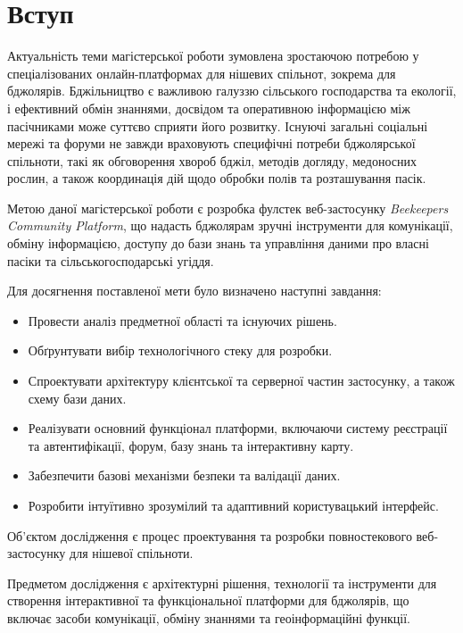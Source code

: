 \chapter*{Вступ}
\label{ch:introduction}

Актуальність теми магістерської роботи зумовлена зростаючою потребою у спеціалізованих онлайн-платформах для нішевих спільнот, зокрема для бджолярів. Бджільництво є важливою галуззю сільського господарства та екології, і ефективний обмін знаннями, досвідом та оперативною інформацією між пасічниками може суттєво сприяти його розвитку. Існуючі загальні соціальні мережі та форуми не завжди враховують специфічні потреби бджолярської спільноти, такі як обговорення хвороб бджіл, методів догляду, медоносних рослин, а також координація дій щодо обробки полів та розташування пасік.

Метою даної магістерської роботи є розробка фулстек веб-застосунку \textit{Beekeepers Community Platform}, що надасть бджолярам зручні інструменти для комунікації, обміну інформацією, доступу до бази знань та управління даними про власні пасіки та сільськогосподарські угіддя.

Для досягнення поставленої мети було визначено наступні завдання:
\begin{itemize}
    \item Провести аналіз предметної області та існуючих рішень.
    \item Обґрунтувати вибір технологічного стеку для розробки.
    \item Спроектувати архітектуру клієнтської та серверної частин застосунку, а також схему бази даних.
    \item Реалізувати основний функціонал платформи, включаючи систему реєстрації та автентифікації, форум, базу знань та інтерактивну карту.
    \item Забезпечити базові механізми безпеки та валідації даних.
    \item Розробити інтуїтивно зрозумілий та адаптивний користувацький інтерфейс.
\end{itemize}

Об'єктом дослідження є процес проектування та розробки повностекового веб-застосунку для нішевої спільноти.

Предметом дослідження є архітектурні рішення, технології та інструменти для створення інтерактивної та функціональної платформи для бджолярів, що включає засоби комунікації, обміну знаннями та геоінформаційні функції.

